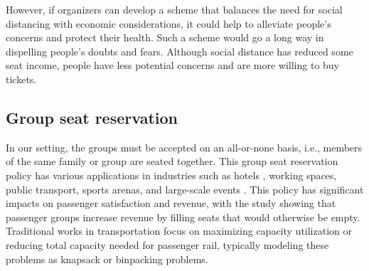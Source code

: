However, if organizers can develop a scheme that balances the need for social distancing with economic considerations, it could help to alleviate people's concerns and protect their health. Such a scheme would go a long way in dispelling people's doubts and fears. Although social distance has reduced some seat income, people have less potential concerns and are more willing to buy tickets.






\subsection{Group seat reservation}
In our setting, the groups must be accepted on an all-or-none basis, i.e., members of the same family or group are seated together. 
This group seat reservation policy has various applications in industries such as hotels \cite{li2013modeling}, working spaces\cite{fischetti2021safe}, public transport\cite{deplano2019offline}, sports arenas\cite{kwag2022optimal}, and large-scale events \cite{lewis2016creating}. This policy has significant impacts on passenger satisfaction and revenue, with the study \cite{yuen2002group} showing that passenger groups increase revenue by filling seats that would otherwise be empty. Traditional works \cite{clausen2010off, deplano2019offline}in transportation focus on maximizing capacity utilization or reducing total capacity needed for passenger rail, typically modeling these problems as knapsack or binpacking problems.

